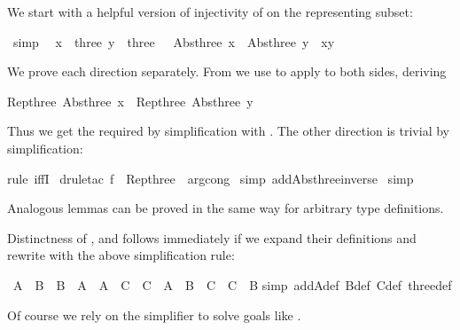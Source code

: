 \begin{isabellebody}
\begin{isamarkuptext}
We start with a helpful version of injectivity of  on the
representing subset:%
\end{isamarkuptext}%
\ {\isacharbrackleft}simp{\isacharbrackright}{\isacharcolon}\isanewline
\ {\isachardoublequote}{\isasymlbrakk}\ x\ {\isasymin}\ three{\isacharsemicolon}\ y\ {\isasymin}\ three\ {\isasymrbrakk}\ {\isasymLongrightarrow}\ {\isacharparenleft}Abs{\isacharunderscore}three\ x\ {\isacharequal}\ Abs{\isacharunderscore}three\ y{\isacharparenright}\ {\isacharequal}\ {\isacharparenleft}x{\isacharequal}y{\isacharparenright}{\isachardoublequote}%
\begin{isamarkuptxt}%
\noindent
We prove each direction separately. From 
we use  to apply  to both sides,
deriving \begin{isabelle}%
Rep{\isacharunderscore}three\ {\isacharparenleft}Abs{\isacharunderscore}three\ x{\isacharparenright}\ {\isacharequal}\ Rep{\isacharunderscore}three\ {\isacharparenleft}Abs{\isacharunderscore}three\ y{\isacharparenright}%
\end{isabelle}
Thus we get the required  by simplification with . 
The other direction
is trivial by simplification:%
\end{isamarkuptxt}%
rule\ iffI{\isacharparenright}\isanewline
\ drule{\isacharunderscore}tac\ f\ {\isacharequal}\ Rep{\isacharunderscore}three\ \ arg{\isacharunderscore}cong{\isacharparenright}\isanewline
\ simp\ add{\isacharcolon}Abs{\isacharunderscore}three{\isacharunderscore}inverse{\isacharparenright}\isanewline
{}\ simp%
\begin{isamarkuptext}%
\noindent
Analogous lemmas can be proved in the same way for arbitrary type definitions.

Distinctness of ,  and  follows immediately
if we expand their definitions and rewrite with the above simplification rule:%
\end{isamarkuptext}%
\ {\isachardoublequote}A\ {\isasymnoteq}\ B\ {\isasymand}\ B\ {\isasymnoteq}\ A\ {\isasymand}\ A\ {\isasymnoteq}\ C\ {\isasymand}\ C\ {\isasymnoteq}\ A\ {\isasymand}\ B\ {\isasymnoteq}\ C\ {\isasymand}\ C\ {\isasymnoteq}\ B{\isachardoublequote}\isanewline
{}simp\ add{\isacharcolon}A{\isacharunderscore}def\ B{\isacharunderscore}def\ C{\isacharunderscore}def\ three{\isacharunderscore}def{\isacharparenright}%
\begin{isamarkuptext}%
\noindent
Of course we rely on the simplifier to solve goals like .


\end{isamarkuptext}
\end{isabellebody}
